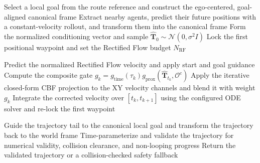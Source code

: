 \begin{algorithm}[t]
\caption{SageFlow Inference with Rectified Flow and Adaptive CBF}
\label{alg:sageflow_inference}
\begin{algorithmic}[1]

\STATE Select a local goal from the route reference and construct the
       ego-centered, goal-aligned canonical frame
\STATE Extract nearby agents, predict their future positions with a
       constant-velocity rollout, and transform them into the canonical frame
\STATE Form the normalized conditioning vector and sample
       $\hat{\mathbf{T}}_0\sim\mathcal{N}(0,\sigma^2I)$
\STATE Lock the first positional waypoint and set the Rectified Flow budget
       $N_{\mathrm{RF}}$

    \STATE Predict the normalized Rectified Flow velocity and apply start and
           goal guidance
    \STATE Compute the composite gate
           $g_k=g_{\mathrm{time}}(\tau_k)g_{\mathrm{prox}}(\hat{\mathbf{T}}_{t_k},\mathcal{O}^c)$
        \STATE Apply the iterative closed-form CBF projection to the XY
               velocity channels and blend it with weight $g_k$
    \ENDIF
    \STATE Integrate the corrected velocity over $[t_k,t_{k+1}]$ using the
           configured ODE solver and re-lock the first waypoint
\ENDFOR

\STATE Guide the trajectory tail to the canonical local goal and transform
       the trajectory back to the world frame
\STATE Time-parameterize and validate the trajectory for numerical validity,
       collision clearance, and non-looping progress
\STATE Return the validated trajectory or a collision-checked safety fallback

\end{algorithmic}
\end{algorithm}
